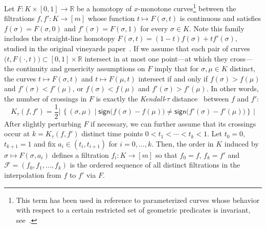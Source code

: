 \documentclass[sn-mathphys]{sn-jnl}
\begin{document}
Let $F : K \times [0,1] \to \mathbb{R}$ be a homotopy of $x$-monotone curves\footnote{This term has been used in reference to parameterized curves whose behavior with respect to a certain restricted set of geometric predicates is invariant, see~\cite{boissonnat2000efficient}. } between the  filtrations 
$f,f' : K \rightarrow [m]$ whose function $t\mapsto F(\sigma, t)$ is continuous and satisfies $f(\sigma) = F(\sigma, 0)$ and $f'(\sigma) = F(\sigma, 1)$ for every  $\sigma \in K$.
Note this family includes the straight-line homotopy $F(\sigma, t) = (1 - t) f(\sigma) + t f'(\sigma)$,  studied in the original vineyards paper~\cite{cohen2006vines}. 
If we assume that each pair of curves $\big(t,  F(\cdot, t)\big) \subset [0,1]\times \mathbb{R}$  intersect in at most one point---at which they cross---the continuity and genericity assumptions on $F$ imply that for $ \sigma,\mu \in K$ distinct,  the curves   $t \mapsto F(\sigma ,t)$ and $t \mapsto F(\mu,t)$ intersect if and only if $f(\sigma) > f(\mu)$ and $f'(\sigma)  < f'(\mu)$, or $f(\sigma) < f(\mu)$ and $f'(\sigma)  > f'(\mu)$. 
 In other words, the number of crossings in $F$ is 
 exactly the  \emph{Kendall}-$\tau$ distance~\cite{diaconis1977spearman} between $f$ and $f'$: 
\begin{equation}\label{eq:kendall_dist}
	K_\tau(f, f') = 
 \frac{1}{2} \left\lvert \, \left\{(\sigma, \mu) \mid \mathsf{sign}\big(f(\sigma) - f(\mu) \big) \neq \mathsf{sign}\big(f'(\sigma) - f'(\mu)\big) \right\} \, \right\rvert
\end{equation}
After slightly perturbing $F$ if necessary,  we can further assume that its crossings occur at  $k = K_\tau(f,f')$ distinct time points $0< t_1 < \cdots < t_k < 1$. 
Let $t_0 = 0$, $t_{k+1}= 1$ and fix 
$a_i \in (t_{i}, t_{i + 1})$ for $i=0, \ldots, k$. 
Then, the order in $K$ induced by $\sigma \mapsto F(\sigma, a_i)$
defines a filtration $f_i : K \rightarrow [m]$
so  that $f_0 = f$, $f_k = f'$ and 
$\mathcal{F} = (f_0, f_1,\ldots, f_k)$ is the ordered sequence of all distinct filtrations in the interpolation from $f$ to $f'$ via $F$.
\end{document}
